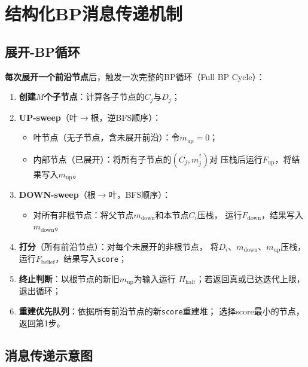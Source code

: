 \documentclass[12pt, a4paper]{ctexart}
\begin{document}
\section{结构化BP消息传递机制}

\subsection{展开-BP循环}

\textbf{每次展开一个前沿节点}后，触发一次完整的BP循环（Full BP Cycle）：
\begin{enumerate}[leftmargin=2em]
  \item \textbf{创建$M$个子节点}：计算各子节点的$C_j$与$D_j$；
  \item \textbf{UP-sweep}（叶$\to$根，逆BFS顺序）：
        \begin{itemize}
          \item 叶节点（无子节点，含未展开前沿）：令$m_{\mathrm{up}}=0$；
          \item 内部节点（已展开）：将所有子节点的$(C_j, m_j^{\uparrow})$对
                压栈后运行$F_{\mathrm{up}}$，将结果写入$m_{\mathrm{up}}$。
        \end{itemize}
  \item \textbf{DOWN-sweep}（根$\to$叶，BFS顺序）：
        \begin{itemize}
          \item 对所有非根节点：将父节点$m_{\mathrm{down}}$和本节点$C_i$压栈，
                运行$F_{\mathrm{down}}$，结果写入$m_{\mathrm{down}}$。
        \end{itemize}
  \item \textbf{打分}（所有前沿节点）：对每个未展开的非根节点，
        将$D_i$、$m_{\mathrm{down}}$、$m_{\mathrm{up}}$压栈，
        运行$F_{\mathrm{belief}}$，结果写入\texttt{score}；
  \item \textbf{终止判断}：以根节点的新旧$m_{\mathrm{up}}$为输入运行
        $H_{\mathrm{halt}}$；若返回真或已达迭代上限，退出循环；
  \item \textbf{重建优先队列}：依据所有前沿节点的新\texttt{score}重建堆；
        选择score最小的节点，返回第1步。
\end{enumerate}

\subsection{消息传递示意图}
\end{document}
